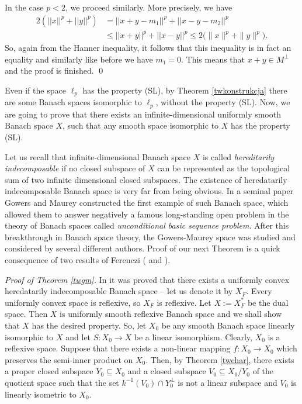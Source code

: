\documentclass[12pt, reqno]{amsart}
\theoremstyle{definition}
\theoremstyle{remark}
\numberwithin{equation}{section}
\begin{document}
In the case $p<2$, we proceed similarly. More precisely, we have
\begin{align*}
2(||x||^p + ||y||^p)&= ||x+y-m_1||^p + ||x-y-m_2||^p \\
&\leq ||x+y||^p + ||x-y||^{p}\leq 2\big(\|x\|^p+\|y\|^p \big).
\end{align*}
So, again from the Hanner inequality, it follows that this inequality is in fact an equality and similarly like before we have $m_1=0$. This means that $x+y \in M^{\perp}$ and the proof is finished. \qed

Even if the space $\ell_p$ has the property (SL), by Theorem \ref{twkonstrukcja} there are some Banach spaces isomorphic to $\ell_p$, without the property (SL). Now, we are going to prove that there exists an infinite-dimensional uniformly smooth Banach space $X$, such that any smooth space isomorphic to $X$ has the property (SL).

Let us recall that infinite-dimensional Banach space $X$ is called \emph{hereditarily indecomposable} if no closed subspace of $X$ can be represented as the topological sum of two infinite dimensional closed subspaces. The existence of heredatarily indecomposable Banach space is very far from being obvious. In a seminal paper \cite{gowers} Gowers and Maurey constructed the first example of such Banach space, which allowed them to answer negatively a famous long-standing open problem in the theory of Banach spaces called \emph{unconditional basic sequence problem}. After this breakthrough in Banach space theory, the Gowers-Maurey space was studied and considered by several different authors. Proof of our next Theorem is a quick consequence of two results of Ferenczi (\cite{ferencziconvex} and \cite{ferencziquotient}).

\emph{Proof of Theorem \ref{twgm}.} In \cite{ferencziconvex} it was proved that there exists a uniformly convex heredatarily indecomposable Banach space -- let us denote it by $X_F$. Every uniformly convex space is reflexive, so $X_F$ is reflexive. Let $X:=X_F^*$ be the dual space. Then $X$ is uniformly smooth reflexive Banach space and we shall show that $X$ has the desired property. So, let $X_0$ be any smooth Banach space linearly isomorphic to $X$ and let $S\colon X_0 \to X$ be a linear isomorphism. Clearly, $X_0$ is a reflexive space. Suppose that there exists a non-linear mapping $f\colon X_0 \to X_0$ which preserves the semi-inner product on $X_0$. Then, by Theorem \ref{twchar}, there exists a proper closed subspace $Y_0 \subseteq X_0$ and a closed subspace $V_0 \subseteq X_0/Y_0$ of the quotient space such that the set $k^{-1}(V_0) \cap Y_0^{\bot}$ is not a linear subspace and $V_0$ is linearly isometric to $X_0$.
\end{document}
